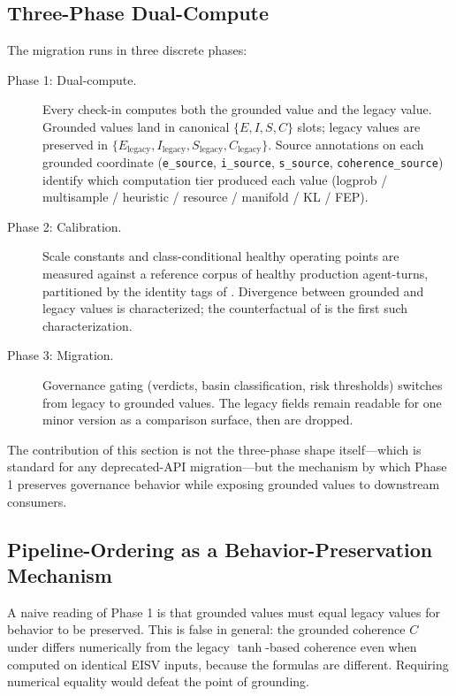 \documentclass[11pt,twocolumn]{article}
\begin{document}
\subsection{Three-Phase Dual-Compute}

The migration runs in three discrete phases:

\begin{description}
\item[Phase 1: Dual-compute.]
  Every check-in computes both the grounded value and the legacy
  value. Grounded values land in canonical
  $\{E, I, S, C\}$ slots; legacy values are preserved in
  $\{E_{\text{legacy}}, I_{\text{legacy}}, S_{\text{legacy}},
  C_{\text{legacy}}\}$. Source annotations on each grounded
  coordinate (\texttt{e\_source}, \texttt{i\_source},
  \texttt{s\_source}, \texttt{coherence\_source}) identify which
  computation tier produced each value (logprob / multisample /
  heuristic / resource / manifold / KL / FEP).
\item[Phase 2: Calibration.]
  Scale constants and class-conditional healthy operating points
  are measured against a reference corpus of healthy production
  agent-turns, partitioned by the identity tags of
  . Divergence between grounded and
  legacy values is characterized; the counterfactual of
   is the first such
  characterization.
\item[Phase 3: Migration.]
  Governance gating (verdicts, basin classification, risk
  thresholds) switches from legacy to grounded values. The
  legacy fields remain readable for one minor version as a
  comparison surface, then are dropped.
\end{description}

The contribution of this section is not the three-phase shape
itself---which is standard for any deprecated-API migration---but
the mechanism by which Phase 1 preserves governance behavior while
exposing grounded values to downstream consumers.

\subsection{Pipeline-Ordering as a Behavior-Preservation Mechanism}
\label{sec:pipeline-ordering}

A naive reading of Phase 1 is that grounded values must equal
legacy values for behavior to be preserved. This is false in
general: the grounded coherence $C$ under 
differs numerically from the legacy
$\tanh$-based coherence even when computed on identical EISV
inputs, because the formulas are different. Requiring numerical
equality would defeat the point of grounding.
\end{document}
